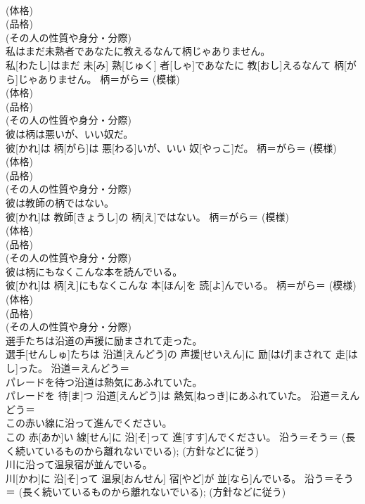 \documentclass[8pt]{extreport}
\begin{document}
\begin{CJK}{UTF8}{min}
{\\	(体格) 
\\	(品格) 
\\	(その人の性質や身分・分際)
\\	私はまだ未熟者であなたに教えるなんて柄じゃありません。	
\\	私[わたし]はまだ 未[み] 熟[じゅく] 者[しゃ]であなたに 教[おし]えるなんて 柄[がら]じゃありません。	柄＝がら＝ (模様) 
\\	(体格) 
\\	(品格) 
\\	(その人の性質や身分・分際)
\\	彼は柄は悪いが、いい奴だ。	
\\	彼[かれ]は 柄[がら]は 悪[わる]いが、いい 奴[やっこ]だ。	柄＝がら＝ (模様) 
\\	(体格) 
\\	(品格) 
\\	(その人の性質や身分・分際)
\\	彼は教師の柄ではない。	
\\	彼[かれ]は 教師[きょうし]の 柄[え]ではない。	柄＝がら＝ (模様) 
\\	(体格) 
\\	(品格) 
\\	(その人の性質や身分・分際)
\\	彼は柄にもなくこんな本を読んでいる。	
\\	彼[かれ]は 柄[え]にもなくこんな 本[ほん]を 読[よ]んでいる。	柄＝がら＝ (模様) 
\\	(体格) 
\\	(品格) 
\\	(その人の性質や身分・分際)
\\	選手たちは沿道の声援に励まされて走った。	
\\	選手[せんしゅ]たちは 沿道[えんどう]の 声援[せいえん]に 励[はげ]まされて 走[はし]った。	沿道＝えんどう＝ 
\\	パレードを待つ沿道は熱気にあふれていた。	
\\	パレードを 待[ま]つ 沿道[えんどう]は 熱気[ねっき]にあふれていた。	沿道＝えんどう＝ 
\\	この赤い線に沿って進んでください。	
\\	この 赤[あか]い 線[せん]に 沿[そ]って 進[すす]んでください。	沿う＝そう＝ (長く続いているものから離れないでいる); (方針などに従う)
\\	川に沿って温泉宿が並んでいる。	
\\	川[かわ]に 沿[そ]って 温泉[おんせん] 宿[やど]が 並[なら]んでいる。	沿う＝そう＝ (長く続いているものから離れないでいる); (方針などに従う)
}
\end{CJK}
\end{document}
